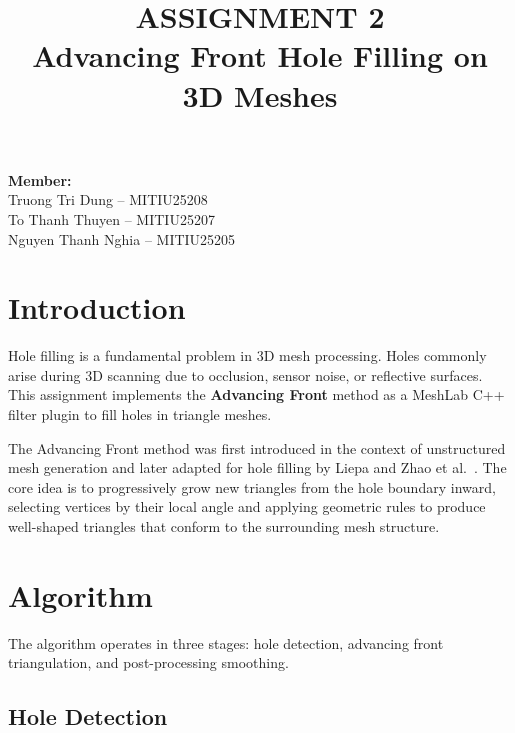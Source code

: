 \documentclass[12pt,a4paper]{article}
\title{
  \textbf{ASSIGNMENT 2} \\[0.5em]
  \Large Advancing Front Hole Filling on 3D Meshes
}
\author{}
\date{}
\begin{document}
\maketitle

\noindent\textbf{Member:} \\
Truong Tri Dung -- MITIU25208 \\
To Thanh Thuyen -- MITIU25207 \\
Nguyen Thanh Nghia -- MITIU25205

\vspace{1em}

\section{Introduction}

Hole filling is a fundamental problem in 3D mesh processing. Holes commonly arise during 3D scanning due to occlusion, sensor noise, or reflective surfaces. This assignment implements the \textbf{Advancing Front} method as a MeshLab C++ filter plugin to fill holes in triangle meshes.

The Advancing Front method was first introduced in the context of unstructured mesh generation \cite{lo1985} and later adapted for hole filling by Liepa \cite{liepa2003} and Zhao et al.\ \cite{zhao2007}. The core idea is to progressively grow new triangles from the hole boundary inward, selecting vertices by their local angle and applying geometric rules to produce well-shaped triangles that conform to the surrounding mesh structure.

\section{Algorithm}

The algorithm operates in three stages: hole detection, advancing front triangulation, and post-processing smoothing.

\subsection{Hole Detection}
\end{document}
